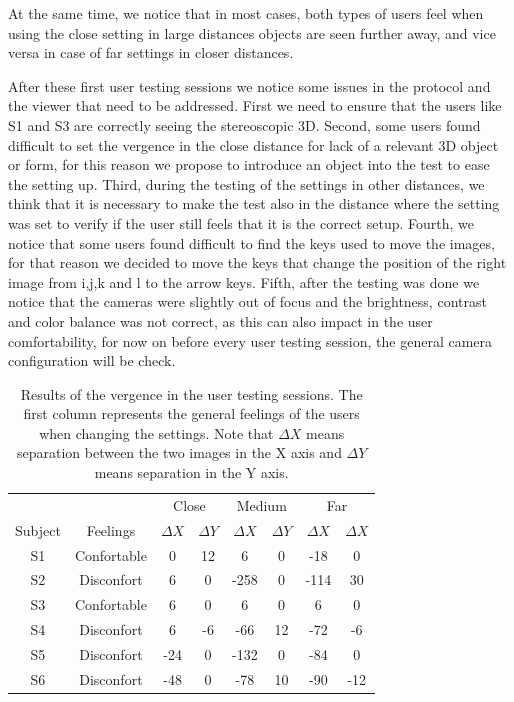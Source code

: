 \documentclass[10pt,a4paper,twocolumn,twoside]{article}
\begin{document}
	At the same time, we notice that in most cases, both types of users feel when using the close setting in large distances objects are seen further away, and vice versa in case of far settings in closer distances.
	
	After these first user testing sessions we notice some issues in the protocol and the viewer that need to be addressed. First we need to ensure that the users like S1 and S3 are correctly seeing the stereoscopic 3D. Second, some users found difficult to set the vergence in the close distance for lack of a relevant 3D object or form, for this reason we propose to introduce an object into the test to ease the setting up. 
	Third, during the testing of the settings in other distances, we think that it is necessary to make the test also in the distance where the setting was set to verify if the user still feels that it is the correct setup. Fourth, we notice that some users found difficult to find the keys used to move the images, for that reason we decided to move the keys that change the position of the right image from i,j,k and l to the arrow keys. Fifth, after the testing was done we notice that the cameras were slightly out of focus and the brightness, contrast and color balance was not correct, as this can also impact in the user comfortability, for now on before every user testing session, the general camera configuration will be check.


	\begin{table}
		\begin{center}
			\begin{tabular}{cccccccc}
				\toprule
				 & & \multicolumn{2}{c}{Close} & \multicolumn{2}{c}{Medium} & \multicolumn{2}{c}{Far} \\ 
				Subject &Feelings & $\Delta X$ & $\Delta Y$ & $\Delta X$ & $\Delta Y$ & $\Delta X$ & $\Delta X$ \\ 
				\midrule
				S1&Confortable & 0 & 12 & 6 & 0 & -18 & 0 \\ 
				\midrule 
			 	S2&Disconfort & 6 & 0 & -258 & 0 & -114 & 30 \\ 
				\midrule
				S3&Confortable & 6 & 0 & 6 & 0 & 6 & 0 \\ 
				\midrule 
				S4&Disconfort & 6 & -6 & -66 & 12 & -72 & -6 \\ 
				\midrule
				S5&Disconfort & -24 & 0 & -132 & 0 & -84 & 0 \\ 
				\midrule
				S6&Disconfort & -48 & 0 & -78 & 10 & -90 & -12 \\ 
				\bottomrule
			\end{tabular} 
		\caption{Results of the vergence in the user testing sessions. The first column represents the general feelings of the users when changing the settings. Note that $\Delta X$ means separation between the two images in the X axis and $\Delta Y$ means separation in the Y axis. }
		\label{tab:userTestResults}
		\end{center}
	\end{table}
\end{document}
